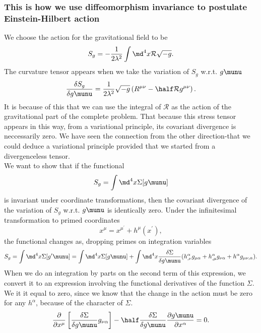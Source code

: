 \subsubsection{This is how we use diffeomorphism invariance to postulate Einstein-Hilbert action}
We choose the action for the gravitational field to be
\begin{equation}
S_g = -\frac{1}{2 \lambda^2} \int \md^4x \mathcal{R}\sqrt{-g}.
\end{equation}
The curvature tensor appears when we take the variation of $S_g$ w.r.t. $g\munu$
\begin{equation}
\frac{\delta S_g}{\delta g\munu} = \frac{1}{2 \lambda^2} \sqrt{-g} \left(R^{\mu \nu} - \half \mathcal{R} g^{\mu \nu}\right).
\end{equation}
It is because of this that we can use the integral of $\mathcal{R}$ as the action of the gravitational part of the complete problem.
That because this stress tensor appears in this way, from a variational principle, its covariant divergence is neccessarily zero. We have seen the connection from the other direction-that we could deduce a variational principle provided that we started from a divergenceless tensor. \\
We want to show that if the functional 
\begin{equation}
S_g = \int \md^4 x \Sigma[g\munu]
\end{equation}
is invariant under coordinate transformations, then the covariant divergence of the variation of $S_g$ w.r.t. $g\munu$ is identically zero. Under the infinitesimal transformation to primed coordinates
\begin{equation}
x^\mu = x^{\mu^\prime} + h^\mu(x^\prime),
\end{equation}
the functional changes as, dropping primes on integration variables
\begin{equation}
S_g = \int \md^4 x \Sigma[g^\prime\munu] = \int \md^4 x \Sigma[g\munu] + \int \md^4x \frac{\delta \Sigma}{\delta g\munu} (h^\alpha_{,\nu} g_{\mu \alpha} + h^\alpha_{,\mu} g_{\nu \alpha} + h^\alpha g_{\mu \nu,\alpha} ).
\end{equation}
When we do an integration by parts on the second term of this expression, we convert it to an expression involving the functional derivatives of the function $\Sigma$. We it it equal to zero, since we know that the change in the action must be zero for any $h^\alpha$, because of the character of $\Sigma$.
\begin{equation}
\label{eq:Feynman1}
\frac{\partial}{\partial x^\mu} \left[\frac{\delta \Sigma}{\delta g\munu} g_{\nu \alpha}\right] - \half \frac{\delta \Sigma}{\delta g\munu} \frac{\partial g\munu}{\partial x^\alpha} = 0.
\end{equation}
